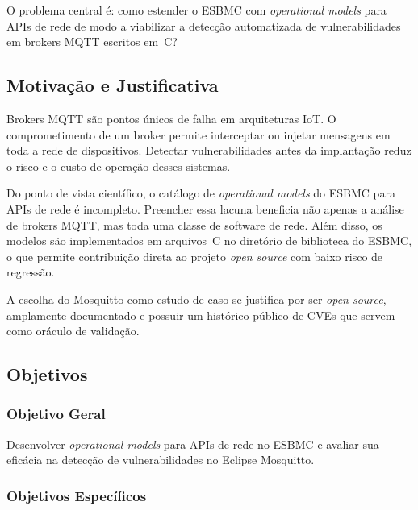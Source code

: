 \documentclass[conference]{IEEEtran}
\begin{document}
O problema central \'e: como estender o ESBMC com \emph{operational models} para APIs de rede de modo a viabilizar a detec\c{c}\~ao automatizada de vulnerabilidades em brokers MQTT escritos em~C?

\subsection{Motiva\c{c}\~ao e Justificativa}
\label{sec:motivacao}

Brokers MQTT s\~ao pontos \'unicos de falha em arquiteturas IoT. O comprometimento de um broker permite interceptar ou injetar mensagens em toda a rede de dispositivos. Detectar vulnerabilidades antes da implanta\c{c}\~ao reduz o risco e o custo de opera\c{c}\~ao desses sistemas.

Do ponto de vista cient\'ifico, o cat\'alogo de \emph{operational models} do ESBMC para APIs de rede \'e incompleto. Preencher essa lacuna beneficia n\~ao apenas a an\'alise de brokers MQTT, mas toda uma classe de software de rede. Al\'em disso, os modelos s\~ao implementados em arquivos~C no diret\'orio de biblioteca do ESBMC, o que permite contribui\c{c}\~ao direta ao projeto \emph{open source} com baixo risco de regress\~ao.

A escolha do Mosquitto como estudo de caso se justifica por ser \emph{open source}, amplamente documentado e possuir um hist\'orico p\'ublico de CVEs que servem como or\'aculo de valida\c{c}\~ao.

\subsection{Objetivos}
\label{sec:objetivos}

\subsubsection{Objetivo Geral}

Desenvolver \emph{operational models} para APIs de rede no ESBMC e avaliar sua efic\'acia na detec\c{c}\~ao de vulnerabilidades no Eclipse Mosquitto.

\subsubsection{Objetivos Espec\'ificos}
\end{document}
